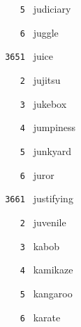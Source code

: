 \documentclass[11pt]{article}
\begin{document}
\begin{multicols}{6}
\noindent \texttt{ \ \ \ 5 } judiciary  \par
\noindent \texttt{ \ \ \ 6 } juggle  \par
\vspace{3mm}
\noindent \texttt{ 3651 } juice  \par
\noindent \texttt{ \ \ \ 2 } jujitsu  \par
\noindent \texttt{ \ \ \ 3 } jukebox  \par
\noindent \texttt{ \ \ \ 4 } jumpiness  \par
\noindent \texttt{ \ \ \ 5 } junkyard  \par
\noindent \texttt{ \ \ \ 6 } juror  \par
\vspace{3mm}
\noindent \texttt{ 3661 } justifying  \par
\noindent \texttt{ \ \ \ 2 } juvenile  \par
\noindent \texttt{ \ \ \ 3 } kabob  \par
\noindent \texttt{ \ \ \ 4 } kamikaze  \par
\noindent \texttt{ \ \ \ 5 } kangaroo  \par
\noindent \texttt{ \ \ \ 6 } karate  \par
\end{multicols}
\end{document}
